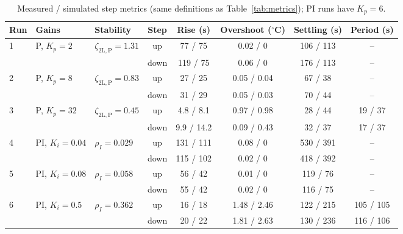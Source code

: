 \documentclass[reprint, amsmath, amssymb, aps, floatfix]{revtex4-2}
\newcommand{\zP}{\zeta_{\mathrm{2L,P}}}
\begin{document}
\begin{table}
\caption{Measured / simulated step metrics (same definitions as Table~\ref{tab:metrics}); PI runs have $K_p = 6$.}
\label{tab:simcomp}
\begin{ruledtabular}
\begin{tabular}{lllccccc}
Run & Gains & Stability & Step & Rise (s) & Overshoot ($^\circ$C) & Settling (s) & Period (s) \\
\hline
1 & P, $K_p = 2$ & $\zP = 1.31$ & up & 77 / 75 & 0.02 / 0 & 106 / 113 & -- \\
 & &  & down & 119 / 75 & 0.06 / 0 & 176 / 113 & -- \\
2 & P, $K_p = 8$ & $\zP = 0.83$ & up & 27 / 25 & 0.05 / 0.04 & 67 / 38 & -- \\
 & &  & down & 31 / 29 & 0.05 / 0.03 & 70 / 44 & -- \\
3 & P, $K_p = 32$ & $\zP = 0.45$ & up & 4.8 / 8.1 & 0.97 / 0.98 & 28 / 44 & 19 / 37 \\
 & &  & down & 9.9 / 14.2 & 0.09 / 0.43 & 32 / 37 & 17 / 37 \\
4 & PI, $K_i = 0.04$ & $\rho_I = 0.029$ & up & 131 / 111 & 0.08 / 0 & 530 / 391 & -- \\
 & &  & down & 115 / 102 & 0.02 / 0 & 418 / 392 & -- \\
5 & PI, $K_i = 0.08$ & $\rho_I = 0.058$ & up & 56 / 42 & 0.01 / 0 & 119 / 76 & -- \\
 & &  & down & 55 / 42 & 0.02 / 0 & 116 / 75 & -- \\
6 & PI, $K_i = 0.5$ & $\rho_I = 0.362$ & up & 16 / 18 & 1.48 / 2.46 & 122 / 215 & 105 / 105 \\
 & &  & down & 20 / 22 & 1.81 / 2.63 & 130 / 236 & 116 / 106 \\
\end{tabular}
\end{ruledtabular}
\end{table}
\end{document}
